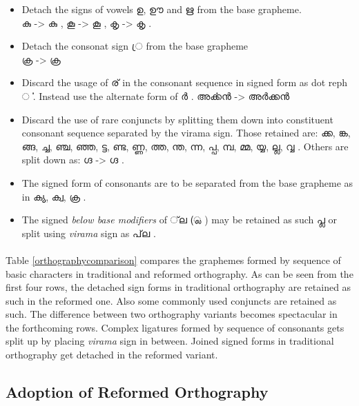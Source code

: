 \documentclass[10pt]{article}
\begin{document}
\begin{itemize}
\item
Detach the signs of vowels {\manjari ഉ, ഊ and ഋ } from the base grapheme.\\
{\manjari കു } -> {\raghu കു } ,
{\manjari കൂ } -> {\raghu കൂ } ,
{\manjari കൃ } -> {\raghu കൃ } .
\item 
Detach the consonat sign {\manjari  ്ര } from the base grapheme \\
{\manjari ക്ര  } -> {\raghu ക്ര  } 
\item
Discard the usage of {\manjari ര് } in the consonant sequence in signed form as dot reph {\manjari ൎ }. Instead use the alternate form of {\manjari ർ }. {\manjari അൎക്കൻ } -> {\manjari അർക്കൻ }

\item
Discard the use of rare conjuncts by splitting them down into constituent consonant sequence separated by the virama sign. Those retained are: {\manjari ക്ക, ങ്ക, ങ്ങ, ച്ച, ഞ്ച, ഞ്ഞ, ട്ട, ണ്ട, ണ്ണ, ത്ത, ന്ത, ന്ന, പ്പ, മ്പ, മ്മ, യ്യ, ല്ല, വ്വ }. Others are split down as: {\manjari ഗ്ദ } -> {\raghu ഗ്ദ }. 

\item
The signed form of consonants are to be separated from the base grapheme as in {\raghu ക്യ, ക്വ, ക്ര }.

\item
The signed \textit{below base modifiers} of {\manjari  ്‌ല  (്ല )  } may be retained as such {\manjari പ്ല } or split using \textit{virama} sign as {\manjari  പ്‌ല }.

\end{itemize}

\paragraph{}
Table \ref{orthographycomparison} compares the graphemes formed by sequence of basic characters in traditional and reformed orthography. As can be seen from the first four rows, the detached sign forms in traditional orthography are retained as such in the reformed one. Also some commonly used conjuncts are retained as such. The difference between two orthography variants becomes spectacular in the forthcoming rows. Complex ligatures formed by sequence of consonants gets split up by placing \textit{virama} sign in between. Joined signed forms in traditional orthography get detached in the reformed variant.


\subsection{Adoption of Reformed Orthography}
\end{document}
